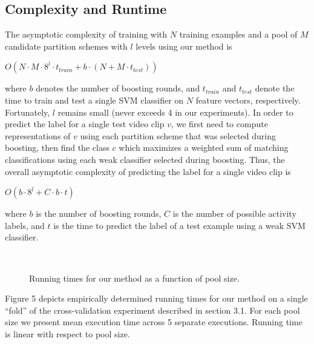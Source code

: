 \documentclass{bmvc2k}
\begin{document}
  \subsection{Complexity and Runtime}
  The asymptotic complexity of training with $N$ training examples 
  and a pool of $M$ candidate partition schemes with $l$ levels using our
  method is 
  \begin{center}
  $O(N\cdot M \cdot 8^l \cdot t_{train} + b \cdot (N + M \cdot t_{test}))$
  \end{center}
  where $b$ denotes the number of boosting rounds, and $t_{train}$ and
  $t_{test}$ denote the time to train and test a single SVM classifier on
  $N$ feature vectors, respectively. Fortunately, $l$ remains small (never
  exceeds 4 in our experiments). In order to predict the label for a single
  test video clip $v$, we first need to compute representations of $v$ using
  each partition scheme that was selected during boosting, then find the
  class $c$ which maximizes a weighted sum of matching classifications using
  each weak classifier selected during boosting.
  Thus, the overall
  asymptotic complexity of predicting the
  label for a single video clip is 
  \begin{center}
  $O(b \cdot 8^l + C \cdot b \cdot t)$
  \end{center}
  where $b$ is the number of boosting rounds, $C$ is the number of possible
  activity labels, and $t$ is the time to predict the label of a test
  example using a weak SVM classifier.
  
\begin{figure}
  \begin{center}
\\
		   \caption{Running times for our method as a function of pool size.}
\label{fig:teaser}
  \end{center}
\end{figure}
  Figure 5 depicts empirically determined running times for our method on a
  single ``fold'' of the cross-validation experiment described in section
  3.1. For each pool size we present mean execution time across 5 separate
  executions. Running time is linear with respect to pool size.
  
\end{document}
